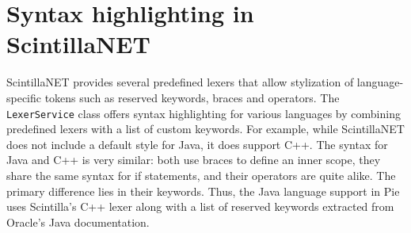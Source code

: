 \section{Syntax highlighting in ScintillaNET}

ScintillaNET provides several predefined lexers that allow stylization of language-specific tokens such as reserved keywords, braces and operators. The \texttt{LexerService} class offers syntax highlighting for various languages by combining predefined lexers with a list of custom keywords. For example, while ScintillaNET does not include a default style for Java, it does support C++. The syntax for Java and C++ is very similar: both use braces to define an inner scope, they share the same syntax for if statements, and their operators are quite alike. The primary difference lies in their keywords. Thus, the Java language support in Pie uses Scintilla's C++ lexer along with a list of reserved keywords extracted from Oracle's Java documentation.

